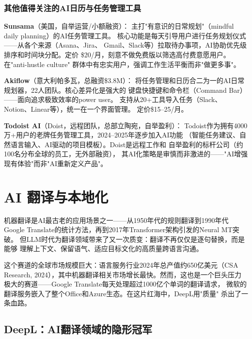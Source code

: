 \subsubsection{其他值得关注的AI日历与任务管理工具}

\textbf{Sunsama}（美国，自举运营/小额融资）：
主打"有意识的日常规划"（mindful daily planning）的AI任务管理工具。
核心功能是每天引导用户进行任务规划仪式——从各个来源（Asana、Jira、
Gmail、Slack等）拉取待办事项，AI协助优先级排序和时间块分配。定价
\$20/月，刻意不做免费版以筛选高付费意愿用户。在"anti-hustle culture"
群体中有忠实用户，强调工作生活平衡而非"做更多事"。

\textbf{Akiflow}（意大利帕多瓦，总融资\$3.8M）：
将任务管理和日历合二为一的AI日常规划器，22人团队。核心差异化是强大的
键盘快捷键和命令栏（Command Bar）——面向追求极致效率的power user。
支持从20+工具导入任务（Slack、Notion、Linear等），统一在一个界面管理。
定价\$15--25/月。

\textbf{Todoist AI}（Doist，远程团队，总部立陶宛，自举盈利）：
Todoist作为拥有4000万+用户的老牌任务管理工具，2024--2025年逐步加入AI功能
（智能任务建议、自然语言输入、AI驱动的项目模板）。Doist是远程工作和
自举盈利的标杆公司（约100名分布全球的员工，无外部融资），
其AI化策略是审慎而非激进的——"AI增强现有体验"而非"AI重新定义产品"。



\section{AI 翻译与本地化}
\label{sec:cprod-translation}

机器翻译是AI最古老的应用场景之一——从1950年代的规则翻译到1990年代Google
Translate的统计方法，再到2017年Transformer架构引发的Neural MT突破。
但LLM时代为翻译领域带来了又一次质变：翻译不再仅仅是逐句替换，而是能够
理解上下文、保留语气、适应目标文化的高质量跨语言沟通。

这个赛道的全球市场规模巨大：语言服务行业2024年总产值约650亿美元（CSA
Research, 2024），其中机器翻译相关市场增长最快。然而，这也是一个巨头压力
极大的赛道——Google Translate每天处理超过1000亿个单词的翻译请求，
微软的翻译服务嵌入了整个Office和Azure生态。在这片红海中，DeepL用"质量"
杀出了一条血路。

\subsection{DeepL：AI翻译领域的隐形冠军}
\label{subsec:deepl}

